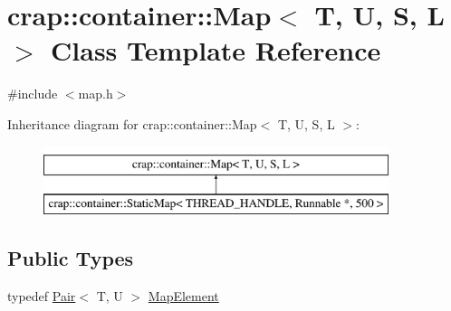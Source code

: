 \hypertarget{classcrap_1_1container_1_1_map}{\section{crap\-:\-:container\-:\-:Map$<$ T, U, S, L $>$ Class Template Reference}
\label{classcrap_1_1container_1_1_map}
}


{\ttfamily \#include $<$map.\-h$>$}

Inheritance diagram for crap\-:\-:container\-:\-:Map$<$ T, U, S, L $>$\-:\begin{figure}[H]
\begin{center}
\leavevmode
\includegraphics[height=2.000000cm]{classcrap_1_1container_1_1_map}
\end{center}
\end{figure}
\subsection*{Public Types}
\begin{DoxyCompactItemize}
\item 
typedef \hyperlink{structcrap_1_1container_1_1_pair}{Pair}$<$ T, U $>$ \hyperlink{classcrap_1_1container_1_1_map_a87121369de54f6650c8a84a0a19fab32}{Map\-Element}
\end{DoxyCompactItemize}
